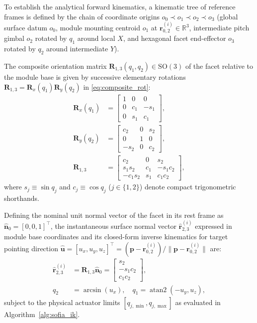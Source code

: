 \documentclass[lettersize,journal]{IEEEtran}
\begin{document}
	To establish the analytical forward kinematics, a kinematic tree of reference frames is defined by the chain of coordinate origins $o_0 \prec o_1 \prec o_2 \prec o_3$ (global surface datum $o_0$, module mounting centroid $o_1$ at $\mathbf{r}_{0,2}^{(i)} \in \mathbb{R}^3$, intermediate pitch gimbal $o_2$ rotated by $q_1$ around local $X$, and hexagonal facet end-effector $o_3$ rotated by $q_2$ around intermediate $Y$).
	
	The composite orientation matrix $\mathbf{R}_{1,3}(q_1, q_2) \in \mathrm{SO}(3)$ of the facet relative to the module base is given by successive elementary rotations $\mathbf{R}_{1,3} = \mathbf{R}_x(q_1)\mathbf{R}_y(q_2)$ in \eqref{eq:composite_rot}:
	\begin{align}
		\mathbf{R}_x(q_1) &= \begin{bmatrix} 1 & 0 & 0 \\ 0 & c_1 & -s_1 \\ 0 & s_1 & c_1 \end{bmatrix}, \label{eq:elementary_rot_x} \\
		\mathbf{R}_y(q_2) &= \begin{bmatrix} c_2 & 0 & s_2 \\ 0 & 1 & 0 \\ -s_2 & 0 & c_2 \end{bmatrix}, \label{eq:elementary_rot_y} \\
		\mathbf{R}_{1,3} &= \begin{bmatrix}
			c_2 & 0 & s_2 \\
			s_1 s_2 & c_1 & -s_1 c_2 \\
			-c_1 s_2 & s_1 & c_1 c_2
		\end{bmatrix}, \label{eq:composite_rot}
	\end{align}
	where $s_j \equiv \sin q_j$ and $c_j \equiv \cos q_j$ ($j \in \{1, 2\}$) denote compact trigonometric shorthands.
	
	Defining the nominal unit normal vector of the facet in its rest frame as $\hat{\mathbf{n}}_0 = [0, 0, 1]^\top$, the instantaneous surface normal vector $\hat{\mathbf{r}}_{2,3}^{(i)}$ expressed in module base coordinates and its closed-form inverse kinematics for target pointing direction $\hat{\mathbf{u}} = [u_x, u_y, u_z]^\top = (\mathbf{p} - \mathbf{r}_{0,2}^{(i)}) / \lVert \mathbf{p} - \mathbf{r}_{0,2}^{(i)} \rVert$ are:
	\begin{align}
		\hat{\mathbf{r}}_{2,3}^{(i)} &= \mathbf{R}_{1,3} \hat{\mathbf{n}}_0 = \begin{bmatrix} s_2 \\ -s_1 c_2 \\ c_1 c_2 \end{bmatrix}, \label{eq:facet_normal} \\
		q_2 &= \arcsin(u_x), \quad q_1 = \operatorname{atan2}(-u_y, u_z), \label{eq:ik_closed_form}
	\end{align}
	subject to the physical actuator limits $[q_{j,\min}, q_{j,\max}]$ as evaluated in Algorithm~\ref{alg:sofia_ik}.
	
\end{document}
